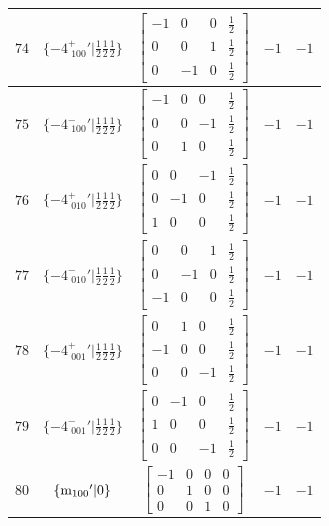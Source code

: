 \documentclass[fleqn,8pt]{jsarticle}
\begin{document}
\begin{longtable}{ccccc}
$ 74 $ & $ \{-4^{+}_{\,\,100}{}'|\frac{1}{2} \frac{1}{2} \frac{1}{2}\} $ & $ \begin{bmatrix} -1 & 0 & 0 & \frac{1}{2} \\ 0 & 0 & 1 & \frac{1}{2} \\ 0 & -1 & 0 & \frac{1}{2} \end{bmatrix} $ & $ -1 $ & $ -1 $ \\ \hline
$ 75 $ & $ \{-4^{-}_{\,\,100}{}'|\frac{1}{2} \frac{1}{2} \frac{1}{2}\} $ & $ \begin{bmatrix} -1 & 0 & 0 & \frac{1}{2} \\ 0 & 0 & -1 & \frac{1}{2} \\ 0 & 1 & 0 & \frac{1}{2} \end{bmatrix} $ & $ -1 $ & $ -1 $ \\ \hline
$ 76 $ & $ \{-4^{+}_{\,\,010}{}'|\frac{1}{2} \frac{1}{2} \frac{1}{2}\} $ & $ \begin{bmatrix} 0 & 0 & -1 & \frac{1}{2} \\ 0 & -1 & 0 & \frac{1}{2} \\ 1 & 0 & 0 & \frac{1}{2} \end{bmatrix} $ & $ -1 $ & $ -1 $ \\ \hline
$ 77 $ & $ \{-4^{-}_{\,\,010}{}'|\frac{1}{2} \frac{1}{2} \frac{1}{2}\} $ & $ \begin{bmatrix} 0 & 0 & 1 & \frac{1}{2} \\ 0 & -1 & 0 & \frac{1}{2} \\ -1 & 0 & 0 & \frac{1}{2} \end{bmatrix} $ & $ -1 $ & $ -1 $ \\ \hline
$ 78 $ & $ \{-4^{+}_{\,\,001}{}'|\frac{1}{2} \frac{1}{2} \frac{1}{2}\} $ & $ \begin{bmatrix} 0 & 1 & 0 & \frac{1}{2} \\ -1 & 0 & 0 & \frac{1}{2} \\ 0 & 0 & -1 & \frac{1}{2} \end{bmatrix} $ & $ -1 $ & $ -1 $ \\ \hline
$ 79 $ & $ \{-4^{-}_{\,\,001}{}'|\frac{1}{2} \frac{1}{2} \frac{1}{2}\} $ & $ \begin{bmatrix} 0 & -1 & 0 & \frac{1}{2} \\ 1 & 0 & 0 & \frac{1}{2} \\ 0 & 0 & -1 & \frac{1}{2} \end{bmatrix} $ & $ -1 $ & $ -1 $ \\ \hline
$ 80 $ & $ \{{\rm m}_{100}{}'|0\} $ & $ \begin{bmatrix} -1 & 0 & 0 & 0 \\ 0 & 1 & 0 & 0 \\ 0 & 0 & 1 & 0 \end{bmatrix} $ & $ -1 $ & $ -1 $ \\ \hline

\end{longtable}
\end{document}
